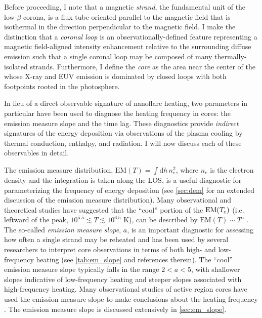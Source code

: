 Before proceeding, I note that a magnetic \textit{strand}, the fundamental unit of the low-$\beta$ corona, is a flux tube oriented parallel to the magnetic field that is isothermal in the direction perpendicular to the magnetic field. I make the distinction that a \textit{coronal loop} is an observationally-defined feature representing a magnetic field-aligned intensity enhancement relative to the surrounding diffuse emission such that a single coronal loop may be composed of many thermally-isolated strands. Furthermore, I define the \AR{} \textit{core} as the area near the center of the \AR{} whose X-ray and EUV emission is dominated by closed loops with both footpoints rooted in the photosphere.

In lieu of a direct observable signature of nanoflare heating, two parameters in particular have been used to diagnose the heating frequency in \AR{} cores: the emission measure slope and the time lag. These diagnostics provide \textit{indirect} signatures of the energy deposition via observations of the plasma cooling by thermal conduction, enthalpy, and radiation. I will now discuss each of these observables in detail.

The emission measure distribution, $\mathrm{EM}(T)=\int\mathrm{d}h\,n_e^2$, where $n_e$ is the electron density and the integration is taken along the LOS, is a useful diagnostic for parameterizing the frequency of energy deposition (see \autoref{sec:dem} for an extended discussion of the emission measure distribution). Many observational and theoretical studies have suggested that the ``cool'' portion of the $\textup{EM}(T_e)$ (i.e. leftward of the peak, $10^{5.5}\lesssim T\lesssim10^{6.5}$ K), can be described by $\mathrm{EM}(T)\sim T^a$ \citep{jordan_structure_1976,cargill_implications_1994,cargill_nanoflare_2004}. The so-called \textit{emission measure slope}, $a$, is an important diagnostic for assessing how often a single strand may be reheated and has been used by several researchers to interpret \AR{} core observations in terms of both high- and low-frequency heating (see \autoref{tab:em_slope} and references therein). The ``cool'' emission measure slope typically falls in the range $2<a<5$, with shallower slopes indicative of low-frequency heating and steeper slopes associated with high-frequency heating. Many observational studies of active region cores have used the emission measure slope to make conclusions about the heating frequency \citep[e.g.][]{tripathi_emission_2011,warren_constraints_2011,winebarger_using_2011,schmelz_cold_2012,warren_systematic_2012,del_zanna_evolution_2015}. The emission measure slope is discussed extensively in \autoref{sec:em_slope}.

